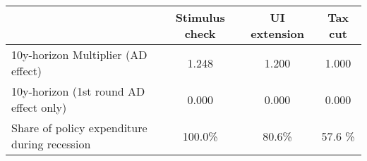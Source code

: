 \begin{tabular}{@{}lccc@{}} 
\toprule 
& Stimulus check    & UI extension    & Tax cut     \\  \midrule 
10y-horizon Multiplier (AD effect) &1.248  & 1.200  & 1.000     \\ 
10y-horizon (1st round AD effect only) &0.000  & 0.000  & 0.000     \\ 
Share of policy expenditure during recession &100.0\%  & 80.6\%  & 57.6 \%    \\ 
\end{tabular}  
